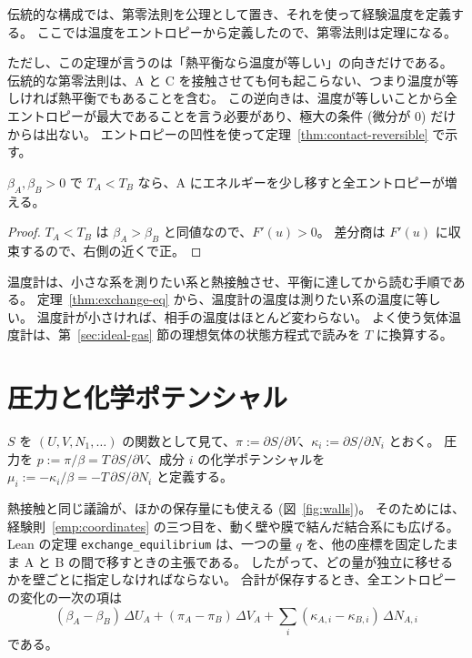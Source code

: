 伝統的な構成では、第零法則を公理として置き、それを使って経験温度を定義する。
ここでは温度をエントロピーから定義したので、第零法則は定理になる。

ただし、この定理が言うのは「熱平衡なら温度が等しい」の向きだけである。
伝統的な第零法則は、A と C を接触させても何も起こらない、つまり温度が等しければ熱平衡でもあることを含む。
この逆向きは、温度が等しいことから全エントロピーが最大であることを言う必要があり、極大の条件 (微分が $0$) だけからは出ない。
エントロピーの凹性を使って定理~\ref{thm:contact-reversible} で示す。

\begin{theorem}[熱は温度の高い系から低い系へ流れる]
  \label{thm:exchange-dir}
  \leanok
  $\beta_A, \beta_B > 0$ で $T_A < T_B$ なら、A にエネルギーを少し移すと全エントロピーが増える。
\end{theorem}

\begin{proof}
  \leanok
  $T_A < T_B$ は $\beta_A > \beta_B$ と同値なので、$F'(u) > 0$。
  差分商は $F'(u)$ に収束するので、右側の近くで正。
\end{proof}

温度計は、小さな系を測りたい系と熱接触させ、平衡に達してから読む手順である。
定理~\ref{thm:exchange-eq} から、温度計の温度は測りたい系の温度に等しい。
温度計が小さければ、相手の温度はほとんど変わらない。
よく使う気体温度計は、第~\ref{sec:ideal-gas} 節の理想気体の状態方程式で読みを $T$ に換算する。

\section{圧力と化学ポテンシャル}

\begin{definition}[圧力と化学ポテンシャル]
  \label{def:pressure-mu}
  $S$ を $(U, V, N_1, \dots)$ の関数として見て、$\pi := \partial S/\partial V$、$\kappa_i := \partial S/\partial N_i$ とおく。
  圧力を $p := \pi/\beta = T\, \partial S/\partial V$、成分 $i$ の化学ポテンシャルを $\mu_i := -\kappa_i/\beta = -T\, \partial S/\partial N_i$ と定義する。
\end{definition}

熱接触と同じ議論が、ほかの保存量にも使える (図~\ref{fig:walls})。
そのためには、経験則~\ref{emp:coordinates} の三つ目を、動く壁や膜で結んだ結合系にも広げる。
Lean の定理 \texttt{exchange\_equilibrium} は、一つの量 $q$ を、他の座標を固定したまま A と B の間で移すときの主張である。
したがって、どの量が独立に移せるかを壁ごとに指定しなければならない。
合計が保存するとき、全エントロピーの変化の一次の項は
\[ (\beta_A - \beta_B)\, \Delta U_A + (\pi_A - \pi_B)\, \Delta V_A + \textstyle\sum_i (\kappa_{A,i} - \kappa_{B,i})\, \Delta N_{A,i} \]
である。

